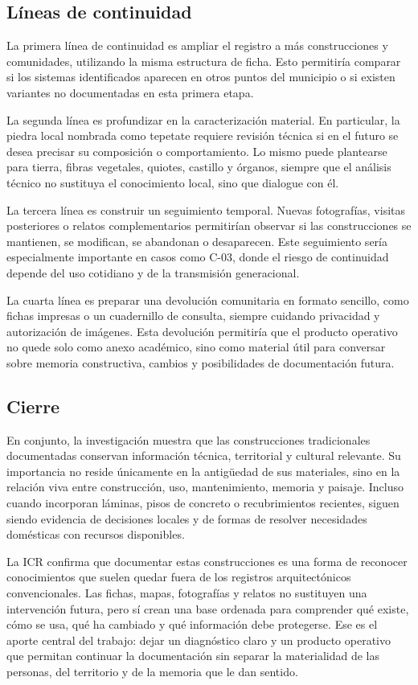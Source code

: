 \subsection{Líneas de continuidad}

La primera línea de continuidad es ampliar el registro a más construcciones y comunidades, utilizando la misma estructura de ficha. Esto permitiría comparar si los sistemas identificados aparecen en otros puntos del municipio o si existen variantes no documentadas en esta primera etapa.

La segunda línea es profundizar en la caracterización material. En particular, la piedra local nombrada como tepetate requiere revisión técnica si en el futuro se desea precisar su composición o comportamiento. Lo mismo puede plantearse para tierra, fibras vegetales, quiotes, castillo y órganos, siempre que el análisis técnico no sustituya el conocimiento local, sino que dialogue con él.

La tercera línea es construir un seguimiento temporal. Nuevas fotografías, visitas posteriores o relatos complementarios permitirían observar si las construcciones se mantienen, se modifican, se abandonan o desaparecen. Este seguimiento sería especialmente importante en casos como C-03, donde el riesgo de continuidad depende del uso cotidiano y de la transmisión generacional.

La cuarta línea es preparar una devolución comunitaria en formato sencillo, como fichas impresas o un cuadernillo de consulta, siempre cuidando privacidad y autorización de imágenes. Esta devolución permitiría que el producto operativo no quede solo como anexo académico, sino como material útil para conversar sobre memoria constructiva, cambios y posibilidades de documentación futura.

\subsection{Cierre}

En conjunto, la investigación muestra que las construcciones tradicionales documentadas conservan información técnica, territorial y cultural relevante. Su importancia no reside únicamente en la antigüedad de sus materiales, sino en la relación viva entre construcción, uso, mantenimiento, memoria y paisaje. Incluso cuando incorporan láminas, pisos de concreto o recubrimientos recientes, siguen siendo evidencia de decisiones locales y de formas de resolver necesidades domésticas con recursos disponibles.

La ICR confirma que documentar estas construcciones es una forma de reconocer conocimientos que suelen quedar fuera de los registros arquitectónicos convencionales. Las fichas, mapas, fotografías y relatos no sustituyen una intervención futura, pero sí crean una base ordenada para comprender qué existe, cómo se usa, qué ha cambiado y qué información debe protegerse. Ese es el aporte central del trabajo: dejar un diagnóstico claro y un producto operativo que permitan continuar la documentación sin separar la materialidad de las personas, del territorio y de la memoria que le dan sentido.
